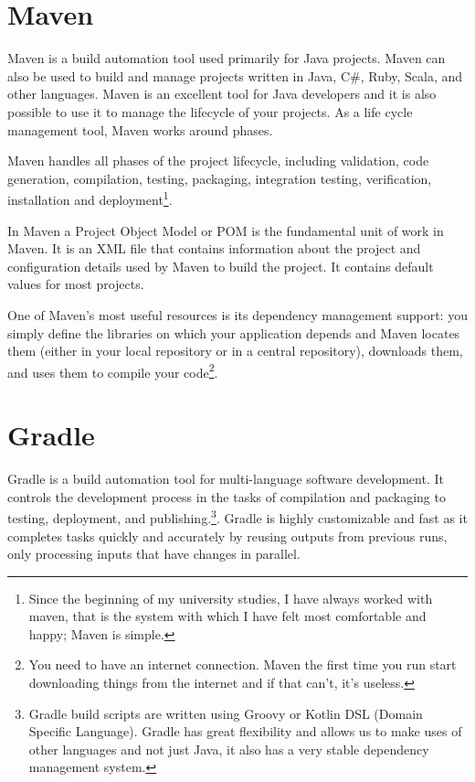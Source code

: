 \documentclass[a4paper,11pt]{article}
\begin{document}
\section{Maven}
Maven is a build automation tool used primarily for Java projects. Maven can also
be used to build and manage projects written in Java, C#, Ruby, Scala, and other 
languages\cite{Maven}. Maven is an excellent tool for Java developers and it is
also possible to use it to manage the lifecycle of your projects. As a life cycle 
management tool, Maven works around phases.

Maven handles all phases of the project lifecycle, including validation, code
generation, compilation, testing, packaging, integration testing, verification,
installation and deployment\footnote{Since the beginning of my university studies,
I have always worked with maven, that is the system with which I have felt most
comfortable and happy; Maven is simple.}.

In Maven a Project Object Model or POM is the fundamental unit of work in Maven.
It is an XML file that contains information about the project and configuration
details used by Maven to build the project. It contains default values for most
projects\cite{Apache}.

One of Maven's most useful resources is its dependency management support: 
you simply define the libraries on which your application depends and Maven locates
them (either in your local repository or in a central repository), downloads them, and
uses them to compile your code\footnote{You need to have an internet connection. 
Maven the first time you run start downloading things from the internet and if that can't,
it's useless.}.

\section{Gradle}
Gradle is a build automation tool for multi-language software development. It controls the
development process in the tasks of compilation and packaging to testing, deployment, and
publishing\cite{Gradle}.\footnote{Gradle build scripts are written using Groovy or Kotlin DSL
(Domain Specific Language). Gradle has great flexibility and allows us to make uses of other
languages and not just Java, it also has a very stable dependency management system.}.
Gradle is highly customizable and fast as it completes tasks quickly and accurately by reusing
outputs from previous runs, only processing inputs that have changes in parallel.
\end{document}
